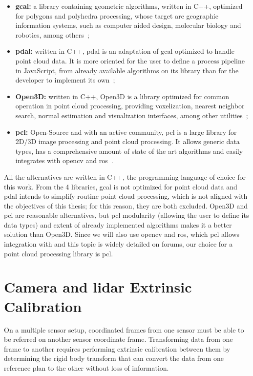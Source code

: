\begin{itemize}
	\item \textbf{\ac{gcal}:}	a library containing geometric algorithms, written in C++, optimized for polygons and polyhedra processing, whose target are geographic information systems, such as computer aided design, molecular biology and robotics, among others~\cite{GCAL};
	\item \textbf{\ac{pdal}:} written in C++, \ac{pdal} is an adaptation of \ac{gcal} optimized to handle point cloud data. It is more oriented for the user to define a process pipeline in JavaScript, from already available algorithms on its library than for the developer to implement its own~\cite{PDAL};
	\item \textbf{Open3D:} written in C++, Open3D is a library optimized for common operation in point cloud processing, providing voxelization, nearest neighbor search, normal estimation and visualization interfaces, among other utilities~\cite{Open3D};
	\item \textbf{\acf{pcl}:} Open-Source and with an active community, \ac{pcl} is a large library for 2D/3D image processing and point cloud processing. It allows generic data types, has a comprehensive amount of state of the art algorithms and easily integrates with \ac{opencv} and \ac{ros}~\cite{PCL}.
\end{itemize}

All the alternatives are written in C++, the programming language of choice for this work. From the 4 libraries, \ac{gcal} is not optimized for point cloud data and \ac{pdal} intends to simplify routine point cloud processing, which is not aligned with the objectives of this thesis; for this reason, they are both excluded. Open3D and \ac{pcl} are reasonable alternatives, but \ac{pcl} modularity (allowing the user to define its data types) and extent of already implemented algorithms makes it a better solution than Open3D. Since we will also use \ac{opencv} and \ac{ros}, which \ac{pcl} allows integration with and this topic is widely detailed on forums, our choice for a point cloud processing library is \ac{pcl}.

\section{Camera and \ac{lidar} Extrinsic Calibration}
\label{sec:sota:extrinsic_calibration}

On a multiple sensor setup, coordinated frames from one sensor must be able to be referred on another sensor coordinate frame. Transforming data from one frame to another requires performing extrinsic calibration between them by determining the rigid body transform that can convert the data from one reference plan to the other without loss of information.

